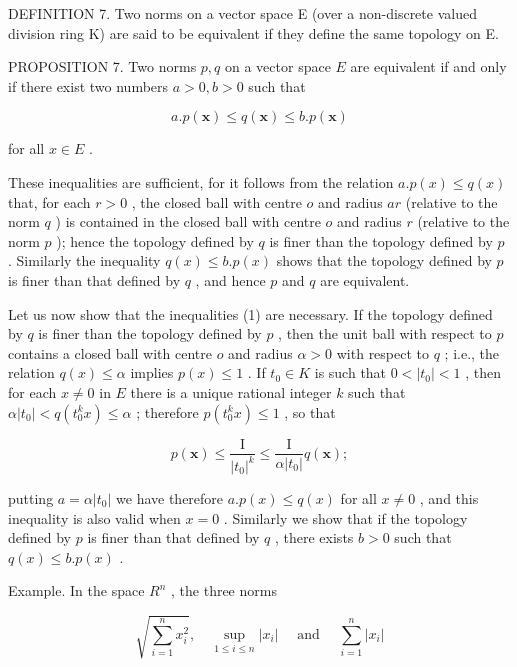 DEFINITION 7. Two norms on a vector space E (over a non-discrete valued division ring K) are said to be equivalent if they define the same topology on E.

PROPOSITION 7. Two norms \(p, q\) on a vector space \(E\) are equivalent if and only if there exist two numbers \(a > 0, b > 0\) such that

\[
a. p (\pmb {x}) \leqslant q (\pmb {x}) \leqslant b. p (\pmb {x})\tag{I}
\]

for all \(x \in E\) .

These inequalities are sufficient, for it follows from the relation \(a.p(x) \leqslant q(x)\) that, for each \(r > 0\) , the closed ball with centre \(o\) and radius \(ar\) (relative to the norm \(q\) ) is contained in the closed ball with centre \(o\) and radius \(r\) (relative to the norm \(p\) ); hence the topology defined by \(q\) is finer than the topology defined by \(p\) . Similarly the inequality \(q(x) \leqslant b.p(x)\) shows that the topology defined by \(p\) is finer than that defined by \(q\) , and hence \(p\) and \(q\) are equivalent.

Let us now show that the inequalities (1) are necessary. If the topology defined by \(q\) is finer than the topology defined by \(p\) , then the unit ball with respect to \(p\) contains a closed ball with centre \(o\) and radius \(\alpha > 0\) with respect to \(q\) ; i.e., the relation \(q(x) \leqslant \alpha\) implies \(p(x) \leqslant 1\) . If \(t_0 \in K\) is such that \(0 < |t_0| < 1\) , then for each \(x \neq 0\) in \(E\) there is a unique rational integer \(k\) such that \(\alpha |t_0| < q(t_0^k x) \leqslant \alpha\) ; therefore \(p(t_0^k x) \leqslant 1\) , so that

\[
p (\boldsymbol {x}) \leqslant \frac {\mathrm{I}}{\left| t _ {0} \right| ^ {k}} \leqslant \frac {\mathrm{I}}{\alpha \left| t _ {0} \right|} q (\boldsymbol {x});
\]

putting \(a = \alpha |t_0|\) we have therefore \(a.p(x) \leqslant q(x)\) for all \(x \neq 0\) , and this inequality is also valid when \(x = 0\) . Similarly we show that if the topology defined by \(p\) is finer than that defined by \(q\) , there exists \(b > 0\) such that \(q(x) \leqslant b.p(x)\) .

Example. In the space \(R^{n}\) , the three norms

\[
\sqrt {\sum_ {i = 1} ^ {n} x _ {i} ^ {2}}, \quad \sup _ {1 \leqslant i \leqslant n} | x _ {i} | \quad \text { and } \quad \sum_ {i = 1} ^ {n} | x _ {i} |
\]

